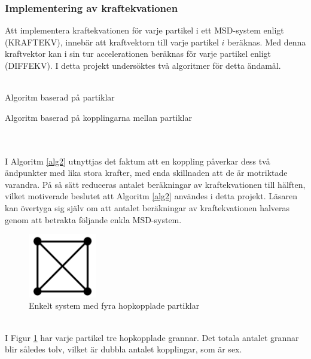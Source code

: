 \documentclass[a4paper,12pt,oneside,final,swedish]{extarticle}
\begin{document}
\subsubsection{Implementering av kraftekvationen}
Att implementera kraftekvationen för varje partikel i ett MSD-system enligt (KRAFTEKV), innebär att kraftvektorn till varje partikel $i$ beräknas. Med denna kraftvektor kan i sin tur accelerationen beräknas för varje partikel enligt (DIFFEKV). I detta projekt undersöktes två algoritmer för detta ändamål.\\\\
\begin{algorithm}[H]
\caption{Algoritm baserad på partiklar\label{alg2}}
\end{algorithm}
\begin{algorithm}[H]
\caption{Algoritm baserad på kopplingarna mellan partiklar\label{alg3}}
\end{algorithm}
\noindent \\\\I Algoritm \ref{alg2} utnyttjas det faktum att en koppling påverkar dess två ändpunkter med lika stora krafter, med enda skillnaden att de är motriktade varandra. På så sätt reduceras antalet beräkningar av kraftekvationen till hälften, vilket motiverade beslutet att Algoritm \ref{alg2} användes i detta projekt. Läsaren kan övertyga sig själv om att antalet beräkningar av kraftekvationen halveras genom att betrakta följande enkla MSD-system.
\begin{figure}[h!]
  \begin{center}
    \includegraphics[width=3cm]{Bilder/2D_2x2.png} 
  \end{center}
  \caption{Enkelt system med fyra hopkopplade partiklar}
  \label{enkelfyra::nonfloat}
\end{figure}
\\I Figur \ref{enkelfyra::nonfloat} har varje partikel tre hopkopplade grannar. Det totala antalet grannar blir således tolv, vilket är dubbla antalet kopplingar, som är sex.
\end{document}
